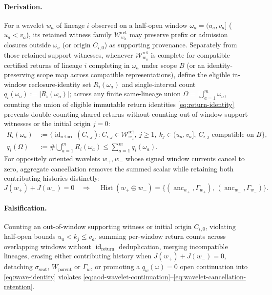\paragraph{Derivation.}
For a wavelet \(w_a\) of lineage \(i\) observed on a half-open window
\(\omega_a=(u_a,v_a]\) (\(u_a<v_a\)), its retained witness family
\(\mathcal W_{w_a}^{\mathrm{ret}}\) may preserve prefix or admission closures
outside \(\omega_a\) (or origin \(C_{i,0}\)) as supporting provenance. Separately
from those retained support witnesses, whenever \(\mathcal W_{w_a}^{\mathrm{ret}}\)
is complete for compatible certified returns of lineage \(i\) completing in
\(\omega_a\) under scope \(B\) (or an identity-preserving scope map across
compatible representations), define the eligible in-window reclosure-identity set
\(R_i(\omega_a)\) and single-interval count \(q_i(\omega_a):=|R_i(\omega_a)|\);
across any finite same-lineage union \(\Omega=\bigcup_{a=1}^m\omega_a\),
counting the union of eligible immutable return identities \eqref{eq:return-identity}
prevents double-counting shared returns without counting out-of-window support
witnesses or the initial origin \(j=0\):
\begin{equation}
\begin{split}
R_i(\omega_a)&:=\bigl\{\operatorname{id}_{\mathrm{return}}(C_{i,j}):C_{i,j}\in\mathcal W_{w_a}^{\mathrm{ret}},\ j\ge 1,\ k_j\in(u_a,v_a],\ C_{i,j}\text{ compatible on }B\bigr\},\\
q_i(\Omega)&:=\#\bigcup_{a=1}^m R_i(\omega_a)\le\sum_{a=1}^m q_i(\omega_a).
\end{split}
\label{eq:wavelet-overlap-dedup}
\end{equation}
For oppositely oriented wavelets \(w_+,w_-\) whose signed window currents
cancel to zero, aggregate cancellation removes the summed scalar while
retaining both contributing histories distinctly:
\begin{equation}
J(w_+)+J(w_-)=0
\quad\Longrightarrow\quad
\operatorname{Hist}(w_+\oplus w_-)=\bigl\{(\operatorname{anc}_{w_+},\Gamma_{w_+}),\,(\operatorname{anc}_{w_-},\Gamma_{w_-})\bigr\}.
\label{eq:wavelet-cancellation-retention}
\end{equation}

\paragraph{Falsification.}
Counting an out-of-window supporting witness or initial origin \(C_{i,0}\),
violating half-open bounds \(u_a<k_j\le v_a\), summing per-window return counts
across overlapping windows without \(\operatorname{id}_{\mathrm{return}}\)
deduplication, merging incompatible lineages, erasing either contributing
history when \(J(w_+)+J(w_-)=0\), detaching \(\sigma_{\mathrm{seat}}\),
\(W_{\mathrm{parent}}\) or \(\Gamma_w\), or promoting a \(q_w(\omega)=0\)
open continuation into \eqref{eq:wave-identity} violates
\eqref{eq:aod-wavelet-continuation}--\eqref{eq:wavelet-cancellation-retention}.

